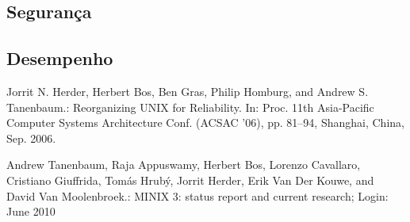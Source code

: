 \documentclass[runningheads]{llncs}
\begin{document}
\subsection{Segurança}

\subsection{Desempenho}


\begin{thebibliography}{8}
Jorrit N. Herder, Herbert Bos, Ben Gras, Philip Homburg, and Andrew S. Tanenbaum.: Reorganizing UNIX for Reliability. In:  Proc. 11th Asia-Pacific Computer Systems Architecture Conf. (ACSAC '06), pp. 81–94, Shanghai, China, Sep. 2006.

Andrew Tanenbaum, Raja Appuswamy, Herbert Bos, Lorenzo Cavallaro, Cristiano Giuffrida, Tomás Hrubý, Jorrit Herder, Erik Van Der Kouwe, and David Van Moolenbroek.: MINIX 3: status report and current research; Login: June 2010

\end{thebibliography}
\end{document}
